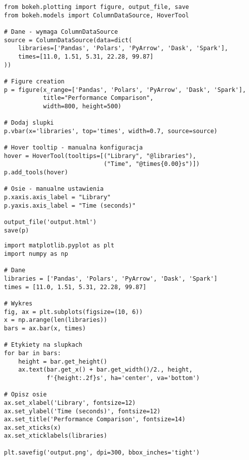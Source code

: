 \begin{lstlisting}[caption={Bokeh - Wykres słupkowy (25 LOC)},label={lst:bokeh_simple}]
from bokeh.plotting import figure, output_file, save
from bokeh.models import ColumnDataSource, HoverTool

# Dane - wymaga ColumnDataSource
source = ColumnDataSource(data=dict(
    libraries=['Pandas', 'Polars', 'PyArrow', 'Dask', 'Spark'],
    times=[11.0, 1.51, 5.31, 22.28, 99.87]
))

# Figure creation
p = figure(x_range=['Pandas', 'Polars', 'PyArrow', 'Dask', 'Spark'],
           title="Performance Comparison",
           width=800, height=500)

# Dodaj slupki
p.vbar(x='libraries', top='times', width=0.7, source=source)

# Hover tooltip - manualna konfiguracja
hover = HoverTool(tooltips=[("Library", "@libraries"), 
                            ("Time", "@times{0.00}s")])
p.add_tools(hover)

# Osie - manualne ustawienia
p.xaxis.axis_label = "Library"
p.yaxis.axis_label = "Time (seconds)"

output_file('output.html')
save(p)
\end{lstlisting}




\begin{lstlisting}[caption={Matplotlib - Wysokiej jakości PNG (20 LOC)},label={lst:matplotlib_simple}]
import matplotlib.pyplot as plt
import numpy as np

# Dane
libraries = ['Pandas', 'Polars', 'PyArrow', 'Dask', 'Spark']
times = [11.0, 1.51, 5.31, 22.28, 99.87]

# Wykres
fig, ax = plt.subplots(figsize=(10, 6))
x = np.arange(len(libraries))
bars = ax.bar(x, times)

# Etykiety na slupkach
for bar in bars:
    height = bar.get_height()
    ax.text(bar.get_x() + bar.get_width()/2., height,
            f'{height:.2f}s', ha='center', va='bottom')

# Opisz osie
ax.set_xlabel('Library', fontsize=12)
ax.set_ylabel('Time (seconds)', fontsize=12)
ax.set_title('Performance Comparison', fontsize=14)
ax.set_xticks(x)
ax.set_xticklabels(libraries)

plt.savefig('output.png', dpi=300, bbox_inches='tight')
\end{lstlisting}


